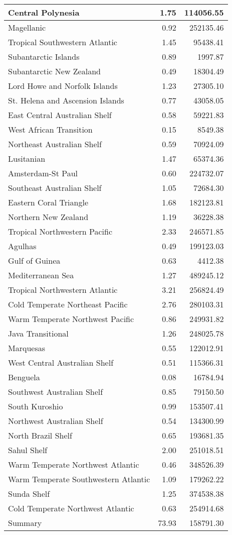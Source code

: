 \begin{table}
\begin{tabular}[t]{l|r|r}
\hline
Central Polynesia & 1.75 & 114056.55\\
\hline
Magellanic & 0.92 & 252135.46\\
\hline
Tropical Southwestern Atlantic & 1.45 & 95438.41\\
\hline
Subantarctic Islands & 0.89 & 1997.87\\
\hline
Subantarctic New Zealand & 0.49 & 18304.49\\
\hline
Lord Howe and Norfolk Islands & 1.23 & 27305.10\\
\hline
St. Helena and Ascension Islands & 0.77 & 43058.05\\
\hline
East Central Australian Shelf & 0.58 & 59221.83\\
\hline
West African Transition & 0.15 & 8549.38\\
\hline
Northeast Australian Shelf & 0.59 & 70924.09\\
\hline
Lusitanian & 1.47 & 65374.36\\
\hline
Amsterdam-St Paul & 0.60 & 224732.07\\
\hline
Southeast Australian Shelf & 1.05 & 72684.30\\
\hline
Eastern Coral Triangle & 1.68 & 182123.81\\
\hline
Northern New Zealand & 1.19 & 36228.38\\
\hline
Tropical Northwestern Pacific & 2.33 & 246571.85\\
\hline
Agulhas & 0.49 & 199123.03\\
\hline
Gulf of Guinea & 0.63 & 4412.38\\
\hline
Mediterranean Sea & 1.27 & 489245.12\\
\hline
Tropical Northwestern Atlantic & 3.21 & 256824.49\\
\hline
Cold Temperate Northeast Pacific & 2.76 & 280103.31\\
\hline
Warm Temperate Northwest Pacific & 0.86 & 249931.82\\
\hline
Java Transitional & 1.26 & 248025.78\\
\hline
Marquesas & 0.55 & 122012.91\\
\hline
West Central Australian Shelf & 0.51 & 115366.31\\
\hline
Benguela & 0.08 & 16784.94\\
\hline
Southwest Australian Shelf & 0.85 & 79150.50\\
\hline
South Kuroshio & 0.99 & 153507.41\\
\hline
Northwest Australian Shelf & 0.54 & 134300.99\\
\hline
North Brazil Shelf & 0.65 & 193681.35\\
\hline
Sahul Shelf & 2.00 & 251018.51\\
\hline
Warm Temperate Northwest Atlantic & 0.46 & 348526.39\\
\hline
Warm Temperate Southwestern Atlantic & 1.09 & 179262.22\\
\hline
Sunda Shelf & 1.25 & 374538.38\\
\hline
Cold Temperate Northwest Atlantic & 0.63 & 254914.68\\
\hline
Summary & 73.93 & 158791.30\\
\hline
\end{tabular}
\end{table}